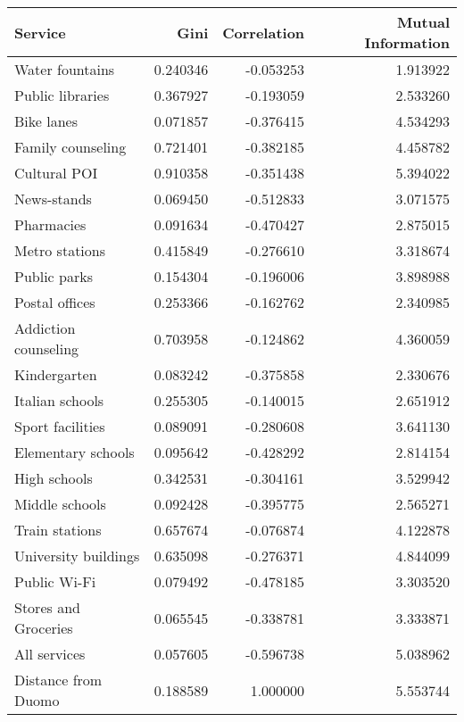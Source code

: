 \documentclass[12pt]{article}
\begin{document}
\begin{table}
\centering
\begin{tabular}{lrrr}
	\toprule
				  Service &     Gini &  Correlation &  Mutual Information \\
	\midrule
		  Water fountains & 0.240346 &    -0.053253 &            1.913922 \\
		 Public libraries & 0.367927 &    -0.193059 &            2.533260 \\
			   Bike lanes & 0.071857 &    -0.376415 &            4.534293 \\
	   Family counseling & 0.721401 &    -0.382185 &            4.458782 \\
			 Cultural POI & 0.910358 &    -0.351438 &            5.394022 \\
			  News-stands & 0.069450 &    -0.512833 &            3.071575 \\
			   Pharmacies & 0.091634 &    -0.470427 &            2.875015 \\
		   Metro stations & 0.415849 &    -0.276610 &            3.318674 \\
			 Public parks & 0.154304 &    -0.196006 &            3.898988 \\
		   Postal offices & 0.253366 &    -0.162762 &            2.340985 \\
	Addiction counseling & 0.703958 &    -0.124862 &            4.360059 \\
			 Kindergarten & 0.083242 &    -0.375858 &            2.330676 \\
		  Italian schools & 0.255305 &    -0.140015 &            2.651912 \\
		 Sport facilities & 0.089091 &    -0.280608 &            3.641130 \\
	   Elementary schools & 0.095642 &    -0.428292 &            2.814154 \\
			 High schools & 0.342531 &    -0.304161 &            3.529942 \\
		   Middle schools & 0.092428 &    -0.395775 &            2.565271 \\
		   Train stations & 0.657674 &    -0.076874 &            4.122878 \\
	 University buildings & 0.635098 &    -0.276371 &            4.844099 \\
					Public Wi-Fi & 0.079492 &    -0.478185 &            3.303520 \\
	 Stores and Groceries & 0.065545 &    -0.338781 &            3.333871 \\
			 All services & 0.057605 &    -0.596738 &            5.038962 \\
			   Distance from Duomo & 0.188589 &     1.000000 &            5.553744 \\
	\bottomrule
	\end{tabular}
	

\end{table}
\end{document}
